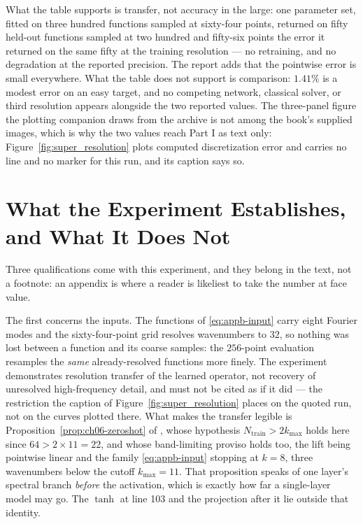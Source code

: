 What the table supports is transfer, not accuracy in the large: one parameter set,
fitted on three hundred functions sampled at sixty-four points, returned on fifty
held-out functions sampled at two hundred and fifty-six points the error it returned on
the same fifty at the training resolution --- no retraining, and no degradation at the
reported precision. The report adds that the pointwise error is small everywhere.
What the table does not support is comparison: $1.41\%$ is a modest error on an easy
target, and no competing network, classical solver, or third resolution appears alongside
the two reported values. The three-panel figure the plotting companion draws from the
archive is not among the book's supplied images, which is why the two values reach Part I as text
only: Figure~\ref{fig:super_resolution} plots computed discretization error and carries
no line and no marker for this run, and its caption says so.

\section{What the Experiment Establishes, and What It Does Not}
\label{sec:appb-scope}

Three qualifications come with this experiment, and they belong in the text, not a
footnote: an appendix is where a reader is likeliest to take the number at face value.

The first concerns the inputs. The functions of \eqref{eq:appb-input} carry eight
Fourier modes and the sixty-four-point grid resolves wavenumbers to $32$, so nothing
was lost between a function and its coarse samples: the $256$-point evaluation
resamples the \emph{same} already-resolved functions more finely. The experiment
demonstrates resolution transfer of the learned operator, not recovery of unresolved
high-frequency detail, and must not be cited as if it did --- the restriction the
caption of Figure~\ref{fig:super_resolution} places on the quoted run, not on the
curves plotted there. What makes the
transfer legible is Proposition~\ref{prop:ch06-zeroshot} of
, whose hypothesis
$N_{\text{train}} > 2k_{\max}$ holds here since $64 > 2\times 11 = 22$, and whose
band-limiting proviso holds too, the lift being pointwise linear and the family
\eqref{eq:appb-input} stopping at $k=8$, three wavenumbers below the cutoff
$k_{\max}=11$. That proposition speaks of one layer's spectral branch \emph{before} the
activation, which is exactly how far a single-layer model may go. The $\tanh$ at line 103
and the projection after it lie outside that identity.

